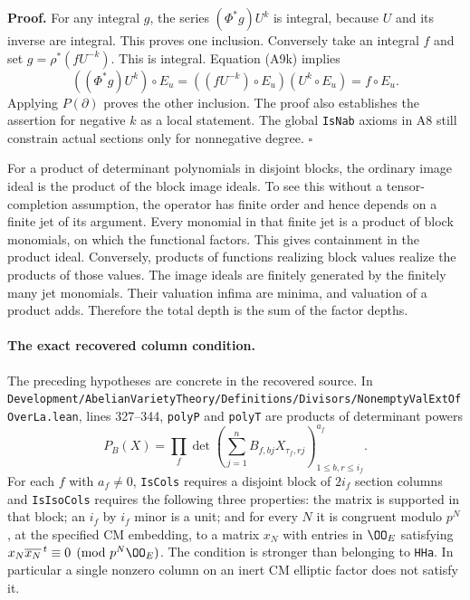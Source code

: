 \textbf{Proof.}
For any integral $g$, the series
$(\Phi^*g)U^k$ is integral, because $U$ and its inverse are
integral.  This proves one inclusion.
Conversely take an integral $f$ and set
$g=\rho^*(fU^{-k})$.  This is integral.  Equation (A9k) implies
\[
 ((\Phi^*g)U^k)\circ E_u
   =((fU^{-k})\circ E_u)(U^k\circ E_u)
   =f\circ E_u.
 \]
Applying $P(\partial)$ proves the other inclusion.
The proof also establishes the assertion for negative $k$
as a local statement.  The global \texttt{IsNab} axioms in A8
still constrain actual sections only for nonnegative degree.
\hfill$\square$

For a product of determinant polynomials in disjoint blocks,
the ordinary image ideal is the product of the block image
ideals.  To see this without a tensor-completion assumption,
the operator has finite order and hence depends on a finite
jet of its argument.  Every monomial in that finite jet is a
product of block monomials, on which the functional factors.
This gives containment in the product ideal.  Conversely,
products of functions realizing block values realize the
products of those values.  The image ideals are finitely
generated by the finitely many jet monomials.  Their valuation
infima are minima, and valuation of a product adds.  Therefore
the total depth is the sum of the factor depths.

\paragraph{The exact recovered column condition.}
The preceding hypotheses are concrete in the recovered source.
In
\texttt{Development/AbelianVarietyTheory/Definitions/Divisors/NonemptyValExtOfOverLa.lean},
lines 327--344, \texttt{polyP} and \texttt{polyT} are products
of determinant powers
\[
 P_B(X)=\prod_f
   \det\left(\sum_{j=1}^n B_{f,bj}X_{\tau_f,rj}
                    \right)_{1\leq b,r\leq i_f}^{a_f}.
 \tag{A9n}
\]
For each $f$ with $a_f\ne0$, \texttt{IsCols} requires a
disjoint block of $2i_f$ section columns and
\texttt{IsIsoCols} requires the following three properties:
the matrix is supported in that block; an $i_f$ by $i_f$
minor is a unit; and for every $N$ it is congruent modulo
$p^N$, at the specified CM embedding, to a matrix
$x_N$ with entries in $\OO_E$ satisfying
$x_N\overline{x_N}^{\,t}\equiv0\pmod{p^N\OO_E}$.
The condition is stronger than belonging to \texttt{HHa}.
In particular a single nonzero column on an inert CM
elliptic factor does not satisfy it.

